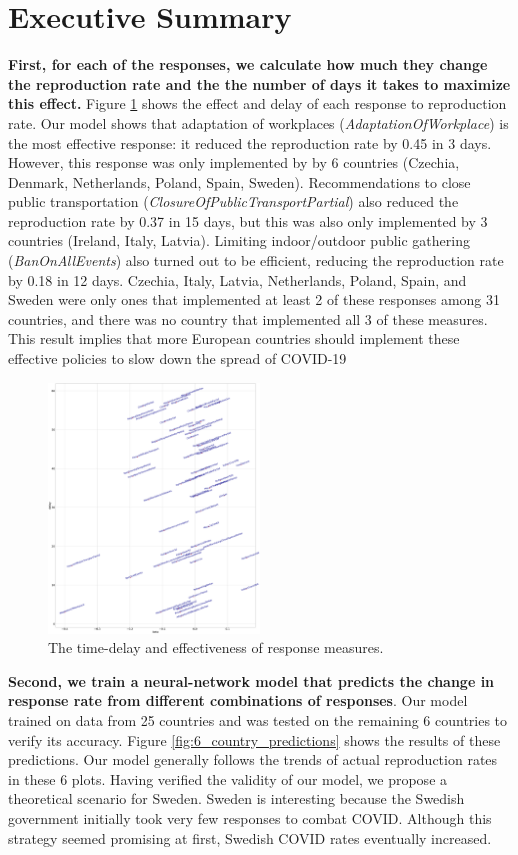 \documentclass[11pt]{article}
\begin{document}
\section{Executive Summary}
\textbf{First, for each of the responses, we calculate how much they change the reproduction rate and the the number of days it takes to maximize this effect.} Figure \ref{fig:delay_eff} shows the effect and delay of each response to reproduction rate. Our model shows that adaptation of workplaces (\textit{AdaptationOfWorkplace}) is the most effective response: it reduced the reproduction rate by 0.45 in 3 days. However, this response was only implemented by by 6 countries (Czechia, Denmark, Netherlands, Poland, Spain, Sweden). Recommendations to close public transportation (\textit{ClosureOfPublicTransportPartial}) also reduced the reproduction rate by 0.37 in 15 days, but this was also only implemented by 3 countries (Ireland, Italy, Latvia). Limiting indoor/outdoor public gathering (\textit{BanOnAllEvents}) also turned out to be efficient, reducing the reproduction rate by 0.18 in 12 days. Czechia, Italy, Latvia, Netherlands, Poland, Spain, and Sweden were only ones that implemented at least 2 of these responses among 31 countries, and there was no country that implemented all 3 of these measures. This result implies that more European countries should implement these effective policies to slow down the spread of COVID-19

\begin{figure}[!hbt]
\centering
\includegraphics[width=0.5\textwidth]{delay_eff.png}
    \caption{The time-delay and effectiveness of response measures.}
    \label{fig:delay_eff}
\end{figure}

\textbf{Second, we train a neural-network model that predicts the change in response rate from different combinations of responses}. Our model trained on data from 25 countries and was tested on the remaining 6 countries to verify its accuracy. Figure \ref{fig:6_country_predictions} shows the results of these predictions. Our model generally follows the trends of actual reproduction rates in these 6 plots. Having verified the validity of our model, we propose a theoretical scenario for Sweden. Sweden is interesting because the Swedish government initially took very few responses to combat COVID. Although this strategy seemed promising at first, Swedish COVID rates eventually increased.
\end{document}

